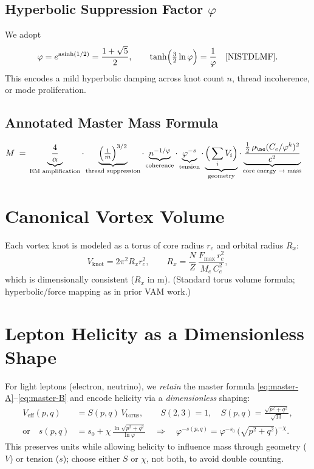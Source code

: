\documentclass[12pt]{article}
\begin{document}
  \subsection*{Hyperbolic Suppression Factor \(\varphi\)}
  We adopt
  \begin{equation}
      \varphi=e^{\operatorname{asinh}(1/2)}=\frac{1+\sqrt{5}}{2},\qquad
      \tanh\!\Big(\tfrac{3}{2}\ln\varphi\Big)=\frac{1}{\varphi}\quad\text{\cite{NISTDLMF}}.
  \end{equation}
  This encodes a mild hyperbolic damping across knot count \(n\), thread incoherence, or mode proliferation.

  \subsection*{Annotated Master Mass Formula}
  \begin{align*}
      M \;=\;
      &\underbrace{\frac{4}{\alpha}}_{\text{EM amplification}}
      \cdot
      \underbrace{\Big(\tfrac{1}{m}\Big)^{3/2}}_{\text{thread suppression}}
      \cdot
      \underbrace{n^{-1/\varphi}}_{\text{coherence}}
      \cdot
      \underbrace{\varphi^{-s}}_{\text{tension}}
      \cdot
      \underbrace{\Big(\sum_i V_i\Big)}_{\text{geometry}}
      \cdot
      \underbrace{\frac{\tfrac12\,\rho_{\ae}(C_e/\varphi^k)^2}{c^2}}_{\text{core energy }\to \text{ mass}}
  \end{align*}

  \section{Canonical Vortex Volume}
  Each vortex knot is modeled as a torus of core radius \(r_c\) and orbital radius \(R_x\):
  \begin{equation}
      V_{\text{knot}}=2\pi^2 R_x r_c^2,\qquad
      R_x=\frac{N}{Z}\,\frac{F_{\max}\,r_c^2}{M_e\,C_e^2},
  \end{equation}
  which is dimensionally consistent (\(R_x\) in m). (Standard torus volume formula; hyperbolic/force mapping as in prior VAM work.)

  \section{Lepton Helicity as a Dimensionless Shape}
  For light leptons (electron, neutrino), we \emph{retain} the master formula \eqref{eq:master-A}–\eqref{eq:master-B} and encode helicity via a \emph{dimensionless} shaping:
  \begin{align}
      V_{\text{eff}}(p,q) &= S(p,q)\,V_{\text{torus}},
      \qquad S(2,3)=1,\quad
      S(p,q)=\frac{\sqrt{p^2+q^2}}{\sqrt{13}}, \\
      \text{or}\quad
      s(p,q) &= s_0 + \chi\,\frac{\ln\!\sqrt{p^2+q^2}}{\ln\varphi}
      \quad\Longrightarrow\quad
      \varphi^{-s(p,q)}=\varphi^{-s_0}\,\big(\sqrt{p^2+q^2}\big)^{-\chi}.
  \end{align}
  This preserves units while allowing helicity to influence mass through geometry (\(V\)) or tension (\(s\)); choose either \(S\) or \(\chi\), not both, to avoid double counting.
\end{document}
